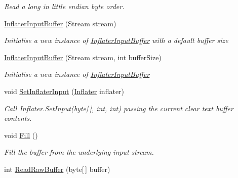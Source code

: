 \begin{DoxyCompactItemize}
\begin{DoxyCompactList}\small\item\em Read a long in little endian byte order. \end{DoxyCompactList}\item 
\hyperlink{class_i_c_sharp_code_1_1_sharp_zip_lib_1_1_zip_1_1_compression_1_1_streams_1_1_inflater_input_buffer_a29ccbb3fa15cead58316762cfa37bd52}{Inflater\+Input\+Buffer} (Stream stream)
\begin{DoxyCompactList}\small\item\em Initialise a new instance of \hyperlink{class_i_c_sharp_code_1_1_sharp_zip_lib_1_1_zip_1_1_compression_1_1_streams_1_1_inflater_input_buffer}{Inflater\+Input\+Buffer} with a default buffer size \end{DoxyCompactList}\item 
\hyperlink{class_i_c_sharp_code_1_1_sharp_zip_lib_1_1_zip_1_1_compression_1_1_streams_1_1_inflater_input_buffer_acb49a5794ba884055d505b84659b583d}{Inflater\+Input\+Buffer} (Stream stream, int buffer\+Size)
\begin{DoxyCompactList}\small\item\em Initialise a new instance of \hyperlink{class_i_c_sharp_code_1_1_sharp_zip_lib_1_1_zip_1_1_compression_1_1_streams_1_1_inflater_input_buffer}{Inflater\+Input\+Buffer} \end{DoxyCompactList}\item 
void \hyperlink{class_i_c_sharp_code_1_1_sharp_zip_lib_1_1_zip_1_1_compression_1_1_streams_1_1_inflater_input_buffer_ab6122d2c0162fcb65003978234151851}{Set\+Inflater\+Input} (\hyperlink{class_i_c_sharp_code_1_1_sharp_zip_lib_1_1_zip_1_1_compression_1_1_inflater}{Inflater} inflater)
\begin{DoxyCompactList}\small\item\em Call Inflater.\+Set\+Input(byte\mbox{[}$\,$\mbox{]}, int, int) passing the current clear text buffer contents. \end{DoxyCompactList}\item 
void \hyperlink{class_i_c_sharp_code_1_1_sharp_zip_lib_1_1_zip_1_1_compression_1_1_streams_1_1_inflater_input_buffer_a8a952d8bf72896646040449cbc5106e8}{Fill} ()
\begin{DoxyCompactList}\small\item\em Fill the buffer from the underlying input stream. \end{DoxyCompactList}\item 
int \hyperlink{class_i_c_sharp_code_1_1_sharp_zip_lib_1_1_zip_1_1_compression_1_1_streams_1_1_inflater_input_buffer_a39f57266c6bd03228ff0a46ec3d73943}{Read\+Raw\+Buffer} (byte\mbox{[}$\,$\mbox{]} buffer)

\end{DoxyCompactItemize}
